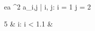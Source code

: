 \begin{eqcode}{e}{a }{^2}{}
  a_{i,j} | i, j: i = 1 \cap j = 2 \gets
  \begin{cases}
    5 & i: i < 1.1  & \otherwise \lend
  \end{cases} \lend
\end{eqcode}
